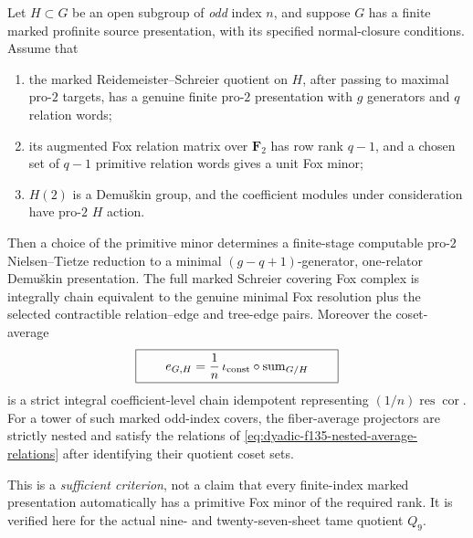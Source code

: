 \begin{theorem}
\label{thm:dyadic-f135-general-primitive-schreier-criterion}
Let $H\subset G$
be an open
subgroup of
\emph{odd}
index $n$,
and suppose
$G$ has a
finite marked
profinite source
presentation,
with its
specified
normal-closure
conditions.
Assume that
\begin{enumerate}[label=\textnormal{(\roman*)}]
\item the marked
Reidemeister--Schreier
quotient on $H$,
after passing
to maximal
pro-$2$ targets,
has a genuine
finite pro-$2$
presentation with
$g$ generators
and $q$ relation
words;
\item its
augmented
Fox relation
matrix over
$\mathbf F_2$
has row rank
$q-1$, and
a chosen set
of $q-1$ primitive
relation words
gives a
unit Fox minor;
\item $H(2)$ is
a Demu\v{s}kin
group, and the
coefficient
modules under
consideration
have pro-$2$
$H$ action.
\end{enumerate}
Then a choice
of the primitive
minor determines
a finite-stage
computable
pro-$2$
Nielsen--Tietze
reduction to
a minimal
$(g-q+1)$-generator,
one-relator
Demu\v{s}kin
presentation.
The full marked
Schreier covering
Fox complex is
integrally
chain equivalent
to the genuine
minimal Fox
resolution plus
the selected
contractible
relation--edge
and tree-edge
pairs.
Moreover the
coset-average
\begin{equation}\label{eq:dyadic-f135-general-odd-index-projector}
\boxed{\qquad
e_{G,H}=
\frac1n\,\iota_{\rm const}
\circ\operatorname{sum}_{G/H}
\qquad}
\end{equation}
is a strict
integral
coefficient-level
chain idempotent
representing
$(1/n)\operatorname{res}
\operatorname{cor}$.
For a tower of
such marked
odd-index
covers, the
fiber-average
projectors are
strictly nested
and satisfy
the relations
of
\eqref{eq:dyadic-f135-nested-average-relations}
after identifying
their quotient
coset sets.

This is a
\emph{sufficient
criterion},
not a claim
that every
finite-index
marked presentation
automatically
has a primitive
Fox minor of
the required
rank.
It is verified
here for the
actual nine-
and twenty-seven-sheet
tame quotient
$Q_9$.
\end{theorem}

